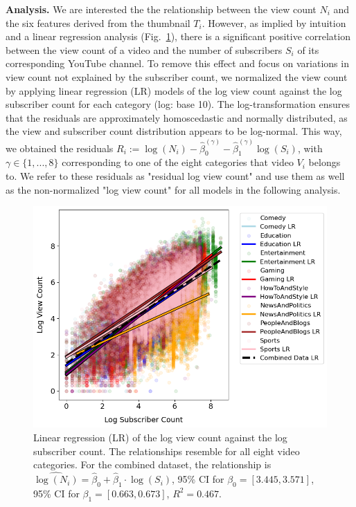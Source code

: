 \documentclass{article}
\begin{document}
\textbf{Analysis.} We are interested the the relationship between the view count $N_i$ and the six features derived from the thumbnail $T_i$. However, as implied by intuition and a linear regression analysis (Fig.~\ref{fig:subscriber}), there is a significant positive correlation between the view count of a video and the number of subscribers $S_i$ of its corresponding YouTube channel. To remove this effect and focus on variations in view count not explained by the subscriber count, we normalized the view count by applying linear regression (LR) models of the log view count against the log subscriber count for each category (log: base 10). The log-transformation ensures that the residuals are approximately homoscedastic and normally distributed, as the view and subscriber count distribution appears to be log-normal. This way, we obtained the residuals $R_{i} := \log(N_i) - \hat{\beta}_0^{(\gamma)} - \hat{\beta}_1^{(\gamma)} \log(S_i)$, with $\gamma \in \{1,..., 8\}$ corresponding to one of the eight categories that video $V_i$ belongs to. We refer to these residuals as "residual log view count" and use them as well as the non-normalized "log view count" for all models in the following analysis.


\begin{figure}[h]
  \begin{minipage}[t]{0.67\textwidth}
    \vspace{0pt}  %
    \includegraphics[width=\textwidth]{figs/subscriber.png}
  \end{minipage}%
  \hspace{0.05\textwidth}%
  \begin{minipage}[t]{0.27\textwidth}
    \vspace{0pt}  %
    \caption{Linear regression (LR) of the log view count against the log subscriber count. The relationships resemble for all eight video categories. For the combined dataset, the relationship is $\widehat{\log(N_i)} = \hat{\beta}_0 + \hat{\beta}_1 \cdot \log(S_i)$, 95\% CI for $\beta_0 = [3.445, 3.571]$, 95\% CI for $\beta_1 = [0.663, 0.673]$, $R^2 = 0.467$.}
    \label{fig:subscriber}
  \end{minipage}
\end{figure}
\end{document}
